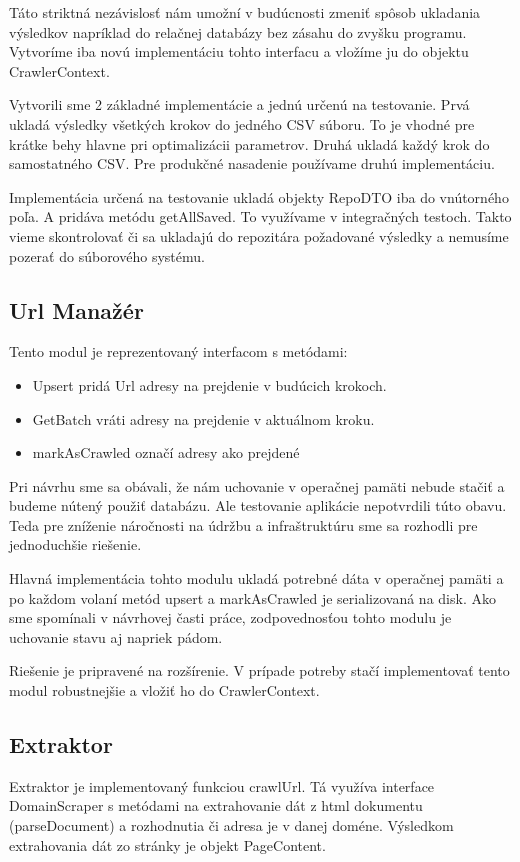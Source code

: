 Táto striktná nezávislosť nám umožní v budúcnosti zmeniť spôsob ukladania výsledkov napríklad do relačnej databázy bez zásahu do zvyšku programu. Vytvoríme iba novú implementáciu tohto interfacu a vložíme ju do objektu CrawlerContext. 

Vytvorili sme 2 základné implementácie a jednú určenú na testovanie. Prvá ukladá výsledky všetkých krokov do jedného CSV súboru. To je vhodné pre krátke behy hlavne pri optimalizácii parametrov. Druhá ukladá každý krok do samostatného CSV. Pre produkčné nasadenie používame druhú implementáciu. 

Implementácia určená na testovanie ukladá objekty RepoDTO iba do vnútorného poľa. A pridáva metódu getAllSaved. To využívame v integračných testoch. Takto vieme skontrolovať či sa ukladajú do repozitára požadované výsledky a nemusíme pozerať do súborového systému. 


\subsection{Url Manažér}
Tento modul je reprezentovaný interfacom s metódami:
\begin{itemize}
    \item Upsert pridá Url adresy na prejdenie v budúcich krokoch. 
    \item GetBatch vráti adresy na prejdenie v aktuálnom kroku. 
    \item markAsCrawled označí adresy ako prejdené
\end{itemize}


Pri návrhu sme sa obávali, že nám uchovanie v operačnej pamäti nebude stačiť a budeme nútený použiť databázu. Ale testovanie aplikácie nepotvrdili túto obavu. Teda pre zníženie náročnosti na údržbu a infraštruktúru sme sa rozhodli pre jednoduchšie riešenie.

Hlavná implementácia tohto modulu ukladá potrebné dáta v operačnej pamäti a po každom volaní metód upsert a markAsCrawled je serializovaná na disk. Ako sme spomínali v návrhovej časti práce, zodpovednosťou tohto modulu je uchovanie stavu aj napriek pádom. 


Riešenie je pripravené na rozšírenie. V prípade potreby stačí implementovať tento modul robustnejšie a vložiť ho do CrawlerContext. 

\subsection{Extraktor}
Extraktor je implementovaný funkciou crawlUrl. Tá využíva interface DomainScraper s metódami na extrahovanie dát z html  dokumentu (parseDocument) a rozhodnutia či adresa je v danej doméne. Výsledkom extrahovania dát zo stránky je objekt PageContent. 

